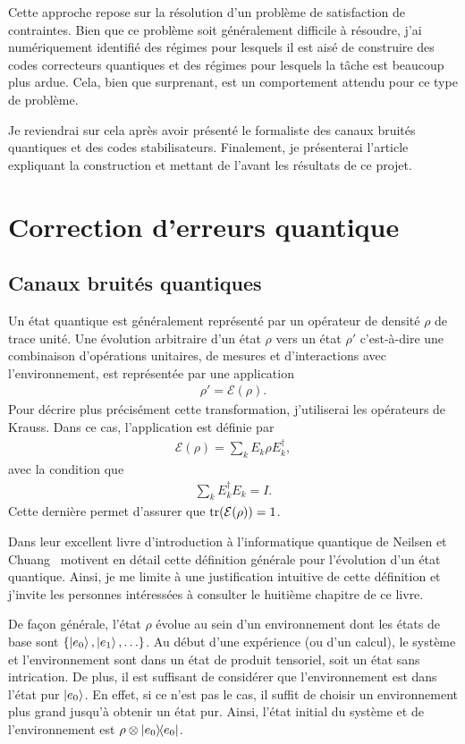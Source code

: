Cette approche repose sur la résolution d'un problème de satisfaction de contraintes.
Bien que ce problème soit généralement difficile à résoudre,
j'ai numériquement identifié des régimes pour lesquels il est aisé de
construire des codes correcteurs quantiques
et des régimes pour lesquels la tâche est beaucoup plus ardue.
Cela, bien que surprenant, est un comportement attendu pour ce type de problème.

Je reviendrai sur cela après avoir présenté le formaliste des canaux bruités quantiques 
et des codes stabilisateurs.
Finalement,
je présenterai l'article expliquant la construction et 
mettant de l'avant les résultats de ce projet.

\section{Correction d'erreurs quantique}

\subsection{Canaux bruités quantiques}

Un état quantique est généralement représenté par un opérateur de densité $\rho$
de trace unité.
Une évolution arbitraire d'un état $\rho$ vers un état $\rho'$
c'est-à-dire une combinaison d'opérations unitaires,
de mesures et d'interactions avec l'environnement, 
est représentée par une application
\begin{align}
  \rho' = \mathcal{E}(\rho).
\end{align}
Pour décrire plus précisément cette transformation,
j'utiliserai les opérateurs de Krauss.
Dans ce cas,
l'application est définie par
\begin{align}
  \mathcal{E}(\rho) = \sum_{k} E_k \rho E_k^\dag,
\end{align}
avec la condition que 
\begin{align}
  \sum_k E_k^\dag E_k = I.
\end{align}
Cette dernière permet d'assurer que $\tr(\mathcal{E}(\rho)) = 1$.

Dans leur excellent livre d'introduction à l'informatique quantique de 
Neilsen et Chuang~\cite{nielsen_quantum_2010} motivent en détail 
cette définition générale pour l'évolution d'un état quantique.
Ainsi, je me limite à une justification intuitive de cette définition
et j'invite les personnes intéressées à consulter le huitième chapitre de ce livre.

De façon générale,
l'état $\rho$ évolue au sein d'un environnement dont les états de base 
sont $\qty{\ket{e_0}, \ket{e_1}, \ldots}$.
Au début d'une expérience (ou d'un calcul),
le système et l'environnement sont dans un état de produit tensoriel,
soit un état sans intrication.
De plus, il est suffisant de considérer que l'environnement est dans l'état 
pur $\ket{e_0}$.
En effet,
si ce n'est pas le cas, il suffit de choisir un environnement plus grand jusqu'à 
obtenir un état pur.
Ainsi,
l'état initial du système et de l'environnement est $\rho \otimes \op{e_0}$.


